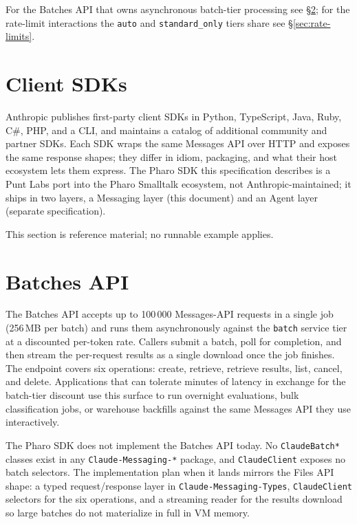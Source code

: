 \documentclass[a4paper,10pt,fleqn]{article}
\begin{document}
For the Batches API that owns asynchronous batch-tier processing
see \S\ref{sec:batches}; for the rate-limit interactions the
\texttt{auto} and \texttt{standard\_only} tiers share see
\S\ref{sec:rate-limits}.

\medskip
{}

\section{Client SDKs}
\label{sec:client-sdks}

Anthropic publishes first-party client SDKs in Python, TypeScript,
Java, Ruby, C\#, PHP, and a CLI, and maintains a catalog of
additional community and partner SDKs.  Each SDK wraps the same
Messages API over HTTP and exposes the same response shapes; they
differ in idiom, packaging, and what their host ecosystem lets them
express.  The Pharo SDK this specification describes is a
Punt Labs port into the Pharo Smalltalk ecosystem, not
Anthropic-maintained; it ships in two layers, a Messaging layer
(this document) and an Agent layer (separate specification).

This section is reference material; no runnable example applies.

\medskip
{}

\section{Batches API}
\label{sec:batches}

The Batches API accepts up to 100\,000 Messages-API requests in a
single job (256\,MB per batch) and runs them asynchronously against
the \texttt{batch} service tier at a discounted per-token rate.
Callers submit a batch, poll for completion, and then stream the
per-request results as a single download once the job finishes.  The
endpoint covers six operations: create, retrieve, retrieve results,
list, cancel, and delete.  Applications that can tolerate minutes of
latency in exchange for the batch-tier discount use this surface to
run overnight evaluations, bulk classification jobs, or warehouse
backfills against the same Messages API they use interactively.

The Pharo SDK does not implement the Batches API today.  No
\texttt{ClaudeBatch*} classes exist in any \texttt{Claude-Messaging-*}
package, and \texttt{ClaudeClient} exposes no batch selectors.  The
implementation plan when it lands mirrors the Files API shape: a
typed request/response layer in \texttt{Claude-Messaging-Types},
\texttt{ClaudeClient} selectors for the six operations, and a
streaming reader for the results download so large batches do not
materialize in full in VM memory.
\end{document}
